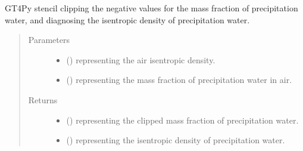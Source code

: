 \documentclass[letterpaper,10pt,english]{sphinxmanual}
\begin{document}
\begin{fulllineitems}
\begin{fulllineitems}
\end{fulllineitems}


\begin{fulllineitems}
\label{\detokenize{api:tasmania.dycore.prognostic_isentropic_nonconservative_centered.PrognosticIsentropicNonconservativeCentered._stencil_clipping_mass_fraction_and_diagnosing_isentropic_density_of_precipitation_water_defs}}
GT4Py stencil clipping the negative values for the mass fraction of precipitation water,
and diagnosing the isentropic density of precipitation water.
\begin{quote}\begin{description}
\item[{Parameters}] \leavevmode\begin{itemize}
\item {} 
 () \textendash{}  representing the air isentropic density.

\item {} 
 () \textendash{}  representing the mass fraction of precipitation water in air.

\end{itemize}

\item[{Returns}] \leavevmode
\begin{itemize}
\item {} 
 () \textendash{}  representing the clipped mass fraction of precipitation water.

\item {} 
 () \textendash{}  representing the isentropic density of precipitation water.

\end{itemize}


\end{description}\end{quote}


\end{fulllineitems}
\end{fulllineitems}
\end{document}
